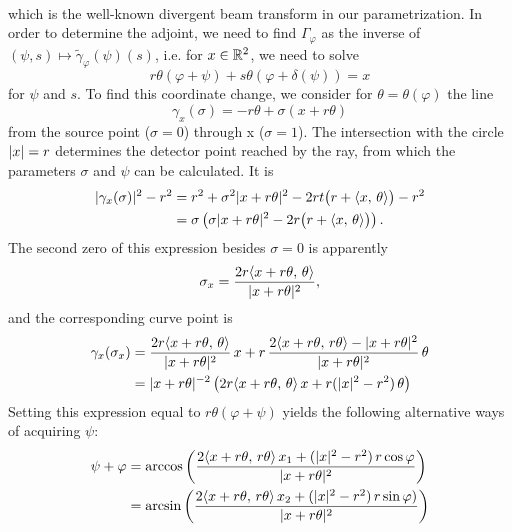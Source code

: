\documentclass{amsart}
\renewcommand*{\phi}{\varphi}
\begin{document}
\begin{example}
\begin{align*}
 \end{align*}
 which is the well-known divergent beam transform in our parametrization. In order to determine the adjoint, we need to find
 $\Gamma_\phi$ as the inverse of $(\psi, s) \mapsto \tilde \gamma_\phi(\psi)(s)$, i.e. for $x \in {\ensuremath{\mathbb{R}}}^2$, we need to solve
 \begin{equation*}
  r\theta(\phi + \psi) + s\theta(\phi + \delta(\psi)) = x
 \end{equation*}
 for $\psi$ and $s$. To find this coordinate change, we consider for $\theta=\theta(\phi)$ the line
 \begin{equation*}
  \gamma_x(\sigma) = -r\theta + \sigma(x+r\theta)
 \end{equation*}
 from the source point ($\sigma=0$) through x ($\sigma=1$). The intersection with the circle $|x|=r$ determines the detector point 
reached by the 
 ray, from which the parameters $\sigma$ and $\psi$ can be calculated. It is
 \begin{align*}
  |\gamma_x(\sigma)|^2 - r^2 
  &= r^2 + \sigma^2 |x + r\theta|^2 -2rt \big(r + \langle x,\,\theta\rangle\big) - r^2 \\
  &= \sigma \left(\sigma |x + r\theta|^2 -2r \big(r + \langle x,\,\theta\rangle\big)\right).
 \end{align*}
 The second zero of this expression besides $\sigma=0$ is apparently
 \begin{equation}
  \sigma_x = \frac{2r \langle x + r\theta,\,\theta\rangle}{|x + r\theta|^2},
 \end{equation} 
 and the corresponding curve point is
 \begin{align*}
  \gamma_x(\sigma_x) &= \frac{2r \langle x + r\theta,\,\theta\rangle}{|x + r\theta|^2}\, x + 
  r\, \frac{2 \langle x + r\theta,\,r\theta\rangle - |x + r\theta|^2}{|x + r\theta|^2}\, \theta \\
  &= |x + r\theta|^{-2} \left(2r \langle x + r\theta,\,\theta\rangle\, x + r(|x|^2 - r^2)\, \theta \right)
 \end{align*}
 Setting this expression equal to $r\theta(\phi + \psi)$ yields the following alternative ways of acquiring $\psi$:
 \begin{align}
  \psi + \phi
  \label{eq:fanbeam_psi_1}
  &= \arccos\left(\frac{2 \INNER{x + r\theta}{r\theta}\, x_1 + (\ABS{x}^2 - r^2)\, r\cos\phi}{\ABS{x + r\theta}^2} \right) \\
  \label{eq:fanbeam_psi_2}
  &= \arcsin\left(\frac{2 \INNER{x + r\theta}{r\theta}\, x_2 + (\ABS{x}^2 - r^2)\, r\sin\phi)}{\ABS{x + r\theta}^2} \right) \\

\end{align}
\end{example}
\end{document}
